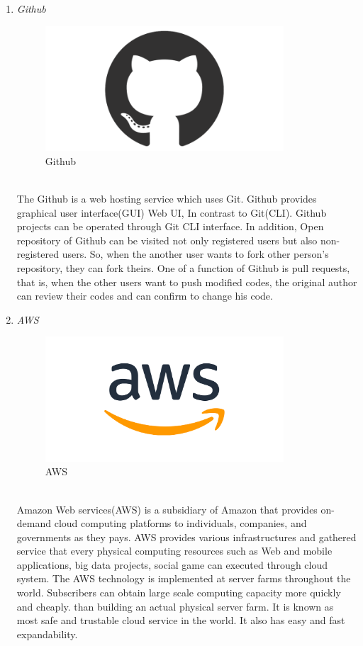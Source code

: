\documentclass[conference]{IEEEtran}
\begin{document}
\begin{enumerate}
   \item \textit{Github}
       \begin{figure}[htbp]
    \centerline{\includegraphics[width=89mm, scale=0.5]{fig/github.png}}
    \caption{Github}
    \label{fig}
    \end{figure}
   \\The Github is a web hosting service which uses Git. Github provides graphical user interface(GUI) Web UI, In contrast to Git(CLI). Github projects can be operated through Git CLI interface. In addition, Open repository of Github can be visited not only registered users but also non-registered users. So, when the another user wants to fork other person’s repository, they can fork theirs. One of a function of Github is pull requests, that is, when the other users want to push modified codes, the original author can review their codes and can confirm to change his code. \\
   \item \textit{AWS }
          \begin{figure}[htbp]
    \centerline{\includegraphics[width=89mm, scale=0.5]{fig/aws.png}}
    \caption{AWS}
    \label{fig}
    \end{figure}
   \\Amazon Web services(AWS) is a subsidiary of Amazon that provides on-demand cloud computing platforms to individuals, companies, and governments as they pays. AWS provides various infrastructures and gathered service that every physical computing resources such as Web and mobile applications, big data projects, social game can executed through cloud system. The AWS technology is implemented at server farms throughout the world. Subscribers can obtain large scale computing capacity more quickly and cheaply. than building an actual physical server farm. It is known as most safe and trustable cloud service in the world. It also has easy and fast expandability. \\

\end{enumerate}
\end{document}
